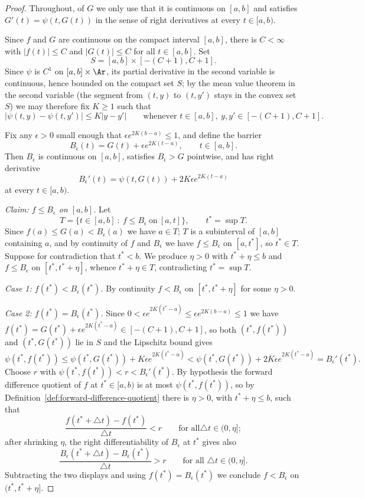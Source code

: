 \begin{proof}
\leanok
Throughout, of $G$ we only use that it is continuous on $[a,b]$ and
satisfies $G'(t)=\psi(t,G(t))$ in the sense of right derivatives at
every $t\in[a,b)$.

Since $f$ and $G$ are continuous on the compact interval $[a,b]$,
there is $C<\infty$ with $|f(t)|\le C$ and $|G(t)|\le C$ for all
$t\in[a,b]$. Set
$$S=[a,b]\times[-(C+1),C+1].$$
Since $\psi$ is $C^1$ on $[a,b]\times\Ar$, its partial derivative in
the second variable is continuous, hence bounded on the compact set
$S$; by the mean value theorem in the second variable (the segment
from $(t,y)$ to $(t,y')$ stays in the convex set $S$) we may
therefore fix $K\ge 1$ such that
$$|\psi(t,y)-\psi(t,y')|\le K|y-y'|\qquad\text{whenever }t\in[a,b],\
y,y'\in[-(C+1),C+1].$$

Fix any $\epsilon>0$ small enough that $\epsilon e^{2K(b-a)}\le 1$,
and define the barrier
$$B_\epsilon(t)=G(t)+\epsilon e^{2K(t-a)},\qquad t\in[a,b].$$
Then $B_\epsilon$ is continuous on $[a,b]$, satisfies
$B_\epsilon>G$ pointwise, and has right derivative
$$B_\epsilon'(t)=\psi(t,G(t))+2K\epsilon e^{2K(t-a)}$$
at every $t\in[a,b)$.

{\em Claim: $f\le B_\epsilon$ on $[a,b]$.} Let
$$T=\{t\in[a,b]\ :\ f\le B_\epsilon\ \text{on}\ [a,t]\},\qquad
t^*=\sup T.$$
Since $f(a)\le G(a)<B_\epsilon(a)$ we have $a\in T$; $T$ is a
subinterval of $[a,b]$ containing $a$, and by continuity of $f$ and
$B_\epsilon$ we have $f\le B_\epsilon$ on $[a,t^*]$, so $t^*\in T$.
Suppose for contradiction that $t^*<b$. We produce $\eta>0$ with
$t^*+\eta\le b$ and $f\le B_\epsilon$ on $[t^*,t^*+\eta]$, whence
$t^*+\eta\in T$, contradicting $t^*=\sup T$.

{\em Case 1: $f(t^*)<B_\epsilon(t^*)$.} By continuity $f<B_\epsilon$
on $[t^*,t^*+\eta]$ for some $\eta>0$.

{\em Case 2: $f(t^*)=B_\epsilon(t^*)$.} Since $0<\epsilon
e^{2K(t^*-a)}\le\epsilon e^{2K(b-a)}\le1$ we have
$f(t^*)=G(t^*)+\epsilon e^{2K(t^*-a)}\in[-(C+1),C+1]$, so both
$(t^*,f(t^*))$ and $(t^*,G(t^*))$ lie in $S$ and the Lipschitz bound
gives
$$\psi(t^*,f(t^*))\le\psi(t^*,G(t^*))+K\epsilon e^{2K(t^*-a)}
<\psi(t^*,G(t^*))+2K\epsilon e^{2K(t^*-a)}=B_\epsilon'(t^*).$$
Choose $r$ with $\psi(t^*,f(t^*))<r<B_\epsilon'(t^*)$. By hypothesis
the forward difference quotient of $f$ at $t^*\in[a,b)$ is at most
$\psi(t^*,f(t^*))$, so by
Definition~\ref{def:forward-difference-quotient} there is $\eta>0$,
with $t^*+\eta\le b$, such that
$$\frac{f(t^*+\triangle t)-f(t^*)}{\triangle t}<r\qquad\text{for all
}\triangle t\in(0,\eta];$$
after shrinking $\eta$, the right differentiability of $B_\epsilon$
at $t^*$ gives also
$$\frac{B_\epsilon(t^*+\triangle t)-B_\epsilon(t^*)}{\triangle
t}>r\qquad\text{for all }\triangle t\in(0,\eta].$$
Subtracting the two displays and using $f(t^*)=B_\epsilon(t^*)$ we
conclude $f<B_\epsilon$ on $(t^*,t^*+\eta]$.


\end{proof}
